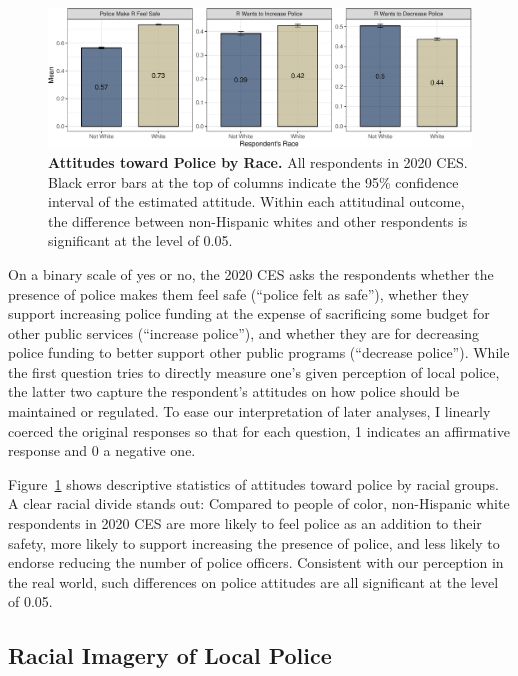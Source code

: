\documentclass[
  12pt,
]{article}
\begin{document}
\begin{figure}[ht]

{\centering \includegraphics{racialized-police_files/figure-pdf/fig-attitudes-1.pdf}

}

\caption{\label{fig-attitudes}\textbf{Attitudes toward Police by Race.}
All respondents in 2020 CES. Black error bars at the top of columns
indicate the 95\% confidence interval of the estimated attitude. Within
each attitudinal outcome, the difference between non-Hispanic whites and
other respondents is significant at the level of 0.05.}

\end{figure}

On a binary scale of yes or no, the 2020 CES asks the respondents
whether the presence of police makes them feel safe (``police felt as
safe''), whether they support increasing police funding at the expense
of sacrificing some budget for other public services (``increase
police''), and whether they are for decreasing police funding to better
support other public programs (``decrease police''). While the first
question tries to directly measure one's given perception of local
police, the latter two capture the respondent's attitudes on how police
should be maintained or regulated. To ease our interpretation of later
analyses, I linearly coerced the original responses so that for each
question, 1 indicates an affirmative response and 0 a negative one.

Figure~\ref{fig-attitudes} shows descriptive statistics of attitudes
toward police by racial groups. A clear racial divide stands out:
Compared to people of color, non-Hispanic white respondents in 2020 CES
are more likely to feel police as an addition to their safety, more
likely to support increasing the presence of police, and less likely to
endorse reducing the number of police officers. Consistent with our
perception in the real world, such differences on police attitudes are
all significant at the level of 0.05.

\hypertarget{racial-imagery-of-local-police}{%
\subsection{Racial Imagery of Local
Police}\label{racial-imagery-of-local-police}}
\end{document}
